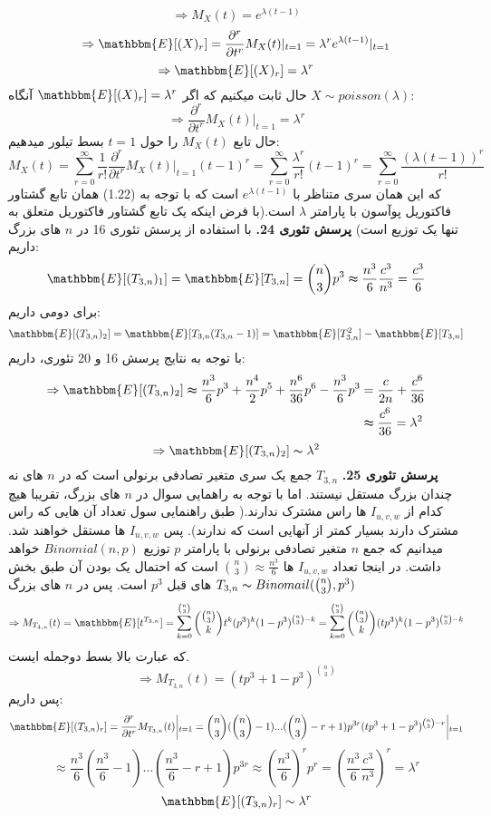 \documentclass[11pt]{article}
\begin{document}
\begin{persian}
$$$$
\begin{equation*}
\Rightarrow M_X(t) = e^{\lambda(t-1)}\tag{1.22}
\end{equation*}
$$
\Rightarrow \mathbbm{E}[(X)_r] = \frac{\partial^r}{\partial t^r}M_X(t) |_{t=1} = \lambda^r e^{\lambda(t-1)} |_{t=1} 
$$
$$
\Rightarrow \mathbbm{E}[(X)_r] = \lambda^r
$$
حال ثابت میکنیم که اگر 
$\mathbbm{E}[(X)_r] = \lambda^r$
آنگاه 
$ X \sim poisson(\lambda)$:
$$
\Rightarrow \frac{\partial^r}{\partial t^r} M_X(t) |_{t=1} = \lambda^r
$$
حال تابع 
$M_X(t)$
را حول 
$t=1$
بسط تیلور میدهیم:
$$
M_X(t) = \sum_{r=0}^{\infty} \frac{1}{r!}\frac{\partial^r}{\partial t^r}M_X(t) |_{t=1} (t-1)^r  = \sum_{r=0}^{\infty} \frac{\lambda^r}{r!} (t-1)^r = \sum_{r=0}^{\infty} \frac{(\lambda(t-1))^r}{r!} 
$$
که این همان سری متناظر با 
$e^{\lambda(t-1)}$
است که با توجه به 
(1.22)
همان تابع گشتاور فاکتوریل پوآسون با پارامتر $\lambda$ است.(با فرض اینکه یک تابع گشتاور فاکتوریل متعلق به تنها یک توزیع است)
\newline
\textbf{پرسش تئوری 24.}
با استفاده از پرسش تئوری 16 در $n$ های بزرگ داریم:
$$
\mathbbm{E}[(T_{3,n})_1] = \mathbbm{E}[T_{3,n}] = {n \choose 3}p^3 \thickapprox \frac{n^3}{6}\frac{c^3}{n^3} = \frac{c^3}{6}
$$
برای دومی داریم:
$$
\mathbbm{E}[(T_{3,n})_2] = \mathbbm{E}[T_{3,n}(T_{3,n}-1)] = \mathbbm{E}[T_{3,n}^2] - \mathbbm{E}[T_{3,n}]  
$$
با توجه به نتایج پرسش 16 و 20 تئوری، داریم:
\begin{align*}
\Rightarrow \mathbbm{E}[(T_{3,n})_2]  \thickapprox  \frac{n^3}{6}  p^3 + \frac{n^4}{2} p^5  + \frac{n^6}{36} p^6 - \frac{n^3}{6}p^3 &= \frac{c}{2n} + \frac{c^6}{36}\\
&\thickapprox \frac{c^6}{36} = \lambda^2
\end{align*} 
$$
\Rightarrow  \mathbbm{E}[(T_{3,n})_2] \thicksim \lambda^2
$$
\textbf{پرسش تئوری 25.}
$T_{3,n}$
جمع یک سری متغیر تصادفی برنولی است که در $n$ های نه چندان بزرگ مستقل نیستند. اما با توجه به راهمایی سوال در $n$ های بزرگ، تقریبا هیچ کدام از
$I_{u,v,w}$ 
ها راس مشترک ندارند.( طبق راهنمایی سول تعداد آن هایی که راس مشترک دارند بسیار کمتر از آنهایی است که ندارند). پس 
$I_{u,v,w}$
ها مستقل خواهند شد. میدانیم که جمع $n$ متغیر تصادفی برنولی با پارامتر $p$ توزیع
$Binomial(n,p)$
خواهد داشت. در اینجا تعداد 
$I_{u,v,w}$
ها 
${n \choose 3} \approx \frac{n^3}{6} $
است که احتمال یک بودن آن طبق بخش های قبل $p^3$ است. پس در $n$ های بزرگ 
$T_{3,n} \thicksim Binomail({n \choose 3},p^3)$
$$
\Rightarrow M_{T_{4,n}}(t) =  \mathbbm{E}[t^{T_{3,n}}] = \sum_{k=0}^{{n \choose 3}} {{n \choose 3} \choose k} t^k (p^3)^k(1-p^3)^{{n \choose 3} - k} = \sum_{k=0}^{{n \choose 3}} {{n \choose 3} \choose k}  (tp^3)^k(1-p^3)^{{n \choose 3} - k}
$$
که عبارت بالا بسط دوجمله ایست.
$$
\Rightarrow M_{T_{3,n}}(t) = (tp^3 + 1 - p^3)^{n \choose 3}
$$
پس داریم:
$$
\mathbbm{E}[(T_{3,n})_r] = \frac{\partial^r}{\partial t^r}M_{T_{3,n}}(t)\, \vline_{\,t=1} = {n \choose 3}({n \choose 3} - 1)...({n \choose 3} - r +1)p^{3r}(tp^3 + 1 - p^3)^{{n \choose 3} - r} \,\vline_{\,t=1}
$$
$$
\approx \frac{n^3}{6}(\frac{n^3}{6} -1)...(\frac{n^3}{6} - r + 1) p^{3r} \approx (\frac{n^3}{6})^r p^r = (\frac{n^3}{6}\frac{c^3}{n^3})^r = \lambda^r
$$
$$
\mathbbm{E}[(T_{3,n})_r] \sim \lambda^r
$$

\end{persian}
\end{document}
